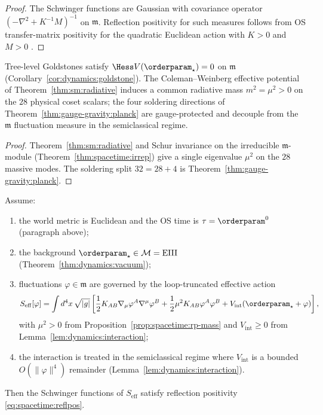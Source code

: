 \begin{proof}
The Schwinger functions are Gaussian with covariance operator
$(-\nabla^2+K^{-1}M)^{-1}$ on $\mathfrak{m}$. Reflection positivity for
such measures follows from OS transfer-matrix positivity for the quadratic
Euclidean action with $K>0$ and $M>0$
\cite{OsterwalderSchrader1973,GlimmJaffe1987}.
\end{proof}

\begin{proposition}
\label{prop:spacetime:rp-mass}
Tree-level Goldstones satisfy $\Hess V(\orderparam_\star)=0$ on
$\mathfrak{m}$ (Corollary~\ref{cor:dynamics:goldstone}). The
Coleman--Weinberg effective potential of Theorem~\ref{thm:sm:radiative}
induces a common radiative mass $m^2=\mu^2>0$ on the $28$ physical coset
scalars; the four soldering directions of
Theorem~\ref{thm:gauge-gravity:planck} are gauge-protected and decouple
from the $\mathfrak{m}$ fluctuation measure in the semiclassical regime.
\end{proposition}

\begin{proof}
Theorem~\ref{thm:sm:radiative} and Schur invariance on the irreducible
$\mathfrak{m}$-module (Theorem~\ref{thm:spacetime:irrep}) give a single
eigenvalue $\mu^2$ on the $28$ massive modes. The soldering split
$32=28+4$ is Theorem~\ref{thm:gauge-gravity:planck}.
\end{proof}

\begin{theorem}
\label{thm:spacetime:rp-semiclassical}
Assume:
\begin{enumerate}[label=(\roman*),leftmargin=*]
  \item the world metric is Euclidean and the OS time is
    $\tau=\orderparam^0$ (paragraph above);
  \item the background $\orderparam_\star\in\mathcal{M}=\mathrm{EIII}$
    (Theorem~\ref{thm:dynamics:vacuum});
  \item fluctuations $\varphi\in\mathfrak{m}$ are governed by the
    loop-truncated effective action
    \begin{equation}\label{eq:spacetime:Seff}
      S_{\mathrm{eff}}[\varphi]
      =\int d^4x\,\sqrt{|g|}\left[
        \frac{1}{2}K_{AB}\nabla_\mu\varphi^A\nabla^\mu\varphi^B
        +\frac{1}{2}\mu^2 K_{AB}\varphi^A\varphi^B
        +V_{\mathrm{int}}(\orderparam_\star+\varphi)\right],
    \end{equation}
    with $\mu^2>0$ from Proposition~\ref{prop:spacetime:rp-mass} and
    $V_{\mathrm{int}}\geq0$ from Lemma~\ref{lem:dynamics:interaction};
  \item the interaction is treated in the semiclassical regime where
    $V_{\mathrm{int}}$ is a bounded $O(\|\varphi\|^4)$ remainder
    (Lemma~\ref{lem:dynamics:interaction}).
\end{enumerate}
Then the Schwinger functions of $S_{\mathrm{eff}}$ satisfy reflection
positivity \eqref{eq:spacetime:reflpos}.
\end{theorem}

